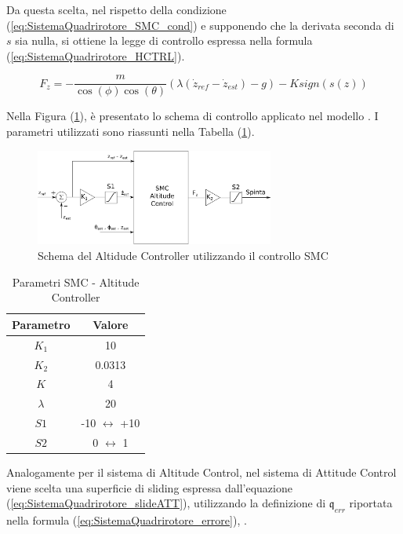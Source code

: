 Da questa scelta, nel rispetto della condizione (\ref{eq:SistemaQuadrirotore_SMC_cond}) e supponendo che la derivata seconda di $s$ sia nulla, si ottiene la legge di controllo espressa nella formula (\ref{eq:SistemaQuadrirotore_HCTRL}).

\begin{equation}\label{eq:SistemaQuadrirotore_HCTRL}
	F_z = -\frac{m}{\cos(\phi) \cos(\theta)} (\lambda (\dot{z}_{ref}-\dot{z}_{est})- g) - K \textit{sign}(s(z))
\end{equation}

Nella Figura (\ref{fig:SMC_ALT}), è presentato lo schema di controllo applicato nel modello . I parametri utilizzati sono riassunti nella Tabella (\ref{tab:ab:SMC_ALT}).

\begin{figure}
	\centering
	\includegraphics[width=0.7\textwidth]{SistemaQuadrirotore/Figure/SMCAltitudeCtrl}
	\caption{Schema del Altidude Controller utilizzando il controllo SMC}
	\label{fig:SMC_ALT}
\end{figure}

\begin{table}
	\centering
	\caption{Parametri SMC - Altitude Controller}
	\begin{tabular}{c c}
		\hline
		Parametro & Valore \\
		\hline
		$K_1$ & 10 \\
		$K_2$ & 0.0313\\
		$K$ & 4\\
		$\lambda$ & 20\\
		$S1$ & -10 $\leftrightarrow$ +10\\
		$S2$ & 0 $\leftrightarrow$ 1\\
		\hline
	\end{tabular}	
	\label{tab:ab:SMC_ALT}
\end{table}

Analogamente per il sistema di Altitude Control, nel sistema di Attitude Control viene scelta una superficie di sliding espressa dall'equazione (\ref{eq:SistemaQuadrirotore_slideATT}), utilizzando la definizione di $\mathfrak{q}_{err}$ riportata nella formula (\ref{eq:SistemaQuadrirotore_errore}), \cite{DesTestCarm}.

